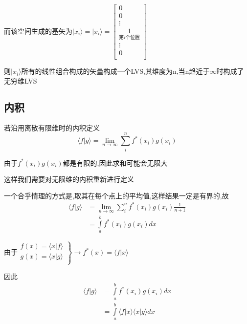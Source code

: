 \documentclass[lang=cn,10pt]{elegantbook}
\begin{document}
而该空间生成的基矢为$|x_i\rangle=|x_i\rangle =\left[ \begin{array}{c}
	0\\
	0\\
	\vdots\\
	\mathop 1 \limits_{\text{第}i\text{个位置}}\\
	\vdots\\
	0\\
\end{array} \right]$

则$|x_i\rangle$所有的线性组合构成的矢量构成一个LVS,其维度为n,当n趋近于$\infty$时构成了无穷维LVS
\subsection{内积}

若沿用离散有限维时的内积定义
\begin{equation*}
	\langle f|g\rangle =\underset{n\rightarrow \infty}{\lim}\sum_i^n{f^*\left( x_i \right) g\left( x_i \right)}
\end{equation*}

由于$f^*\left( x_i \right) g\left( x_i \right)$都是有限的,因此求和可能会无限大

这样我们需要对无限维的内积重新进行定义

一个合乎情理的方式是,取其在每个点上的平均值,这样结果一定是有界的,故
\begin{equation*}
	\begin{split}
		\langle f|g\rangle &=\underset{n\rightarrow \infty}{\lim}\sum_i^n{f^*\left( x_i \right) g\left( x_i \right)}\frac{1}{n+1}
		\\
		&=\int\limits_a^b{f^*\left( x_i \right) g\left( x_i \right) dx}
	\end{split}
\end{equation*}

由于$\left. \begin{array}{r}
	f\left( x \right) =\langle x|f\rangle\\
	g\left( x \right) =\langle x|g\rangle\\
\end{array} \right\} \rightarrow f^*\left( x \right) =\langle f|x\rangle 
$

因此
\begin{equation*}
	\begin{split}
		\langle f|g\rangle &=\int\limits_a^b{f^*\left( x_i \right) g\left( x_i \right) dx}
		\\
		&=\int\limits_a^b{\langle f|x\rangle \langle x|g\rangle dx}	
	\end{split}
\end{equation*}
\end{document}
